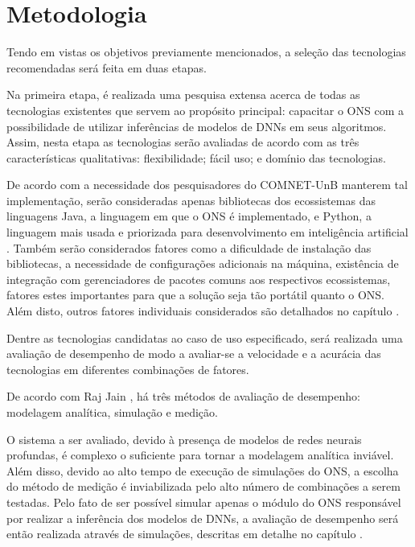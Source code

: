 \section{Metodologia}
\label{intro-methodology}

Tendo em vistas os objetivos previamente mencionados, a seleção das tecnologias recomendadas será feita em duas etapas.

Na primeira etapa, é realizada uma pesquisa extensa acerca de todas as tecnologias existentes que servem ao propósito principal: capacitar o ONS com a possibilidade de utilizar inferências de modelos de DNNs em seus algoritmos. Assim, nesta etapa as tecnologias serão avaliadas de acordo com as três características qualitativas: flexibilidade; fácil uso; e domínio das tecnologias.

De acordo com a necessidade dos pesquisadores do COMNET-UnB manterem tal implementação, serão consideradas apenas bibliotecas dos ecossistemas das linguagens Java, a linguagem em que o ONS é implementado, e Python, a linguagem mais usada e priorizada para desenvolvimento em inteligência artificial \cite{developer_nation_q1_2017}. Também serão considerados fatores como a dificuldade de instalação das bibliotecas, a necessidade de configurações adicionais na máquina, existência de integração com gerenciadores de pacotes comuns aos respectivos ecossistemas, fatores estes importantes para que a solução seja tão portátil quanto o ONS. Além disto, outros fatores individuais considerados são detalhados no capítulo .

Dentre as tecnologias candidatas ao caso de uso especificado, será realizada uma avaliação de desempenho de modo a avaliar-se a velocidade e a acurácia das tecnologias em diferentes combinações de fatores.

De acordo com Raj Jain \cite{jain1991art}, há três métodos de avaliação de desempenho: modelagem analítica, simulação e medição.

O sistema a ser avaliado, devido à presença de modelos de redes neurais profundas, é complexo o suficiente para tornar a modelagem analítica inviável. Além disso, devido ao alto tempo de execução de simulações do ONS, a escolha do método de medição é inviabilizada pelo alto número de combinações a serem testadas. Pelo fato de ser possível simular apenas o módulo do ONS responsável por realizar a inferência dos modelos de DNNs, a avaliação de desempenho será então realizada através de simulações, descritas em detalhe no capítulo \todo[Y (análise)].

